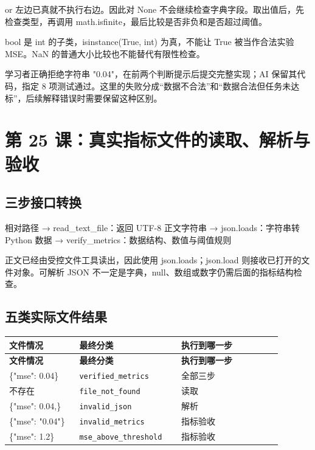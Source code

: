 or 左边已真就不执行右边。因此对 None 不会继续检查字典字段。取出值后，先检查类型，再调用 math.isfinite，最后比较是否非负和是否超过阈值。

bool 是 int 的子类，isinstance(True, int) 为真，不能让 True 被当作合法实验 MSE。NaN 的普通大小比较也不能替代有限性检查。

学习者正确拒绝字符串 "0.04"，在前两个判断提示后提交完整实现；AI 保留其代码，指定 8 项测试通过。这里的失败分成“数据不合法”和“数据合法但任务未达标”，后续解释错误时需要保留这种区别。

\section{第 25 课：真实指标文件的读取、解析与验收}

\subsection{三步接口转换}

\begin{Code}
相对路径
  → read_text_file：返回 UTF-8 正文字符串
  → json.loads：字符串转 Python 数据
  → verify_metrics：数据结构、数值与阈值规则
\end{Code}

正文已经由受控文件工具读出，因此使用 json.loads；json.load 则接收已打开的文件对象。可解析 JSON 不一定是字典，null、数组或数字仍需后面的指标结构检查。

\subsection{五类实际文件结果}

{\small\setlength{\tabcolsep}{4pt}
\renewcommand{\arraystretch}{1.25}
\begin{longtable}{>{\raggedright\arraybackslash}p{0.23\linewidth}>{\raggedright\arraybackslash}p{0.33\linewidth}>{\raggedright\arraybackslash}p{0.33\linewidth}}
\toprule
\textbf{文件情况} & \textbf{最终分类} & \textbf{执行到哪一步} \\
\midrule\endfirsthead
\toprule
\textbf{文件情况} & \textbf{最终分类} & \textbf{执行到哪一步} \\
\midrule\endhead
\bottomrule\endfoot
\{"mse": 0.04\} & \nolinkurl{verified_metrics} & 全部三步 \\
不存在 & \nolinkurl{file_not_found} & 读取 \\
\{"mse": 0.04,\} & \nolinkurl{invalid_json} & 解析 \\
\{"mse": "0.04"\} & \nolinkurl{invalid_metrics} & 指标验收 \\
\{"mse": 1.2\} & \nolinkurl{mse_above_threshold} & 指标验收 \\
\end{longtable}}

